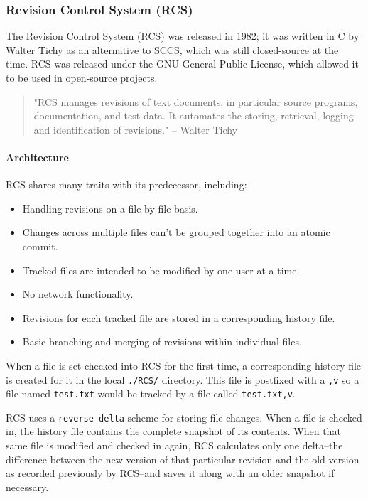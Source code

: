 \subsubsection{Revision Control System (RCS)}
The Revision Control System (RCS) was released in 1982; it was written in C by Walter Tichy as an alternative to SCCS, which was still closed-source at the time. RCS was released under the GNU General Public License, which allowed it to be used in open-source projects.

\begin{quote}
    "RCS manages revisions of text documents, in particular source programs, documentation, and test data. It automates the storing, retrieval, logging and identification of revisions." -- Walter Tichy \cite{tichy_1985}
\end{quote}

\paragraph{Architecture}
RCS shares many traits with its predecessor, including:
\begin{itemize}
    \item Handling revisions on a file-by-file basis.
    \item Changes across multiple files can't be grouped together into an atomic commit.
    \item Tracked files are intended to be modified by one user at a time.
    \item No network functionality.
    \item Revisions for each tracked file are stored in a corresponding history file.
    \item Basic branching and merging of revisions within individual files.
\end{itemize}
When a file is set checked into RCS for the first time, a corresponding history file is created for it in the local \lstinline{./RCS/} directory. This file is postfixed with a \lstinline{,v} so a file named \lstinline{test.txt} would be tracked by a file called \lstinline{test.txt,v}.

RCS uses a \lstinline{reverse-delta} scheme for storing file changes. When a file is checked in, the history file contains the complete snapshot of its contents. When that same file is modified and checked in again, RCS calculates only one delta--the difference between the new version of that particular revision and the old version as recorded previously by RCS--and saves it along with an older snapshot if necessary.

